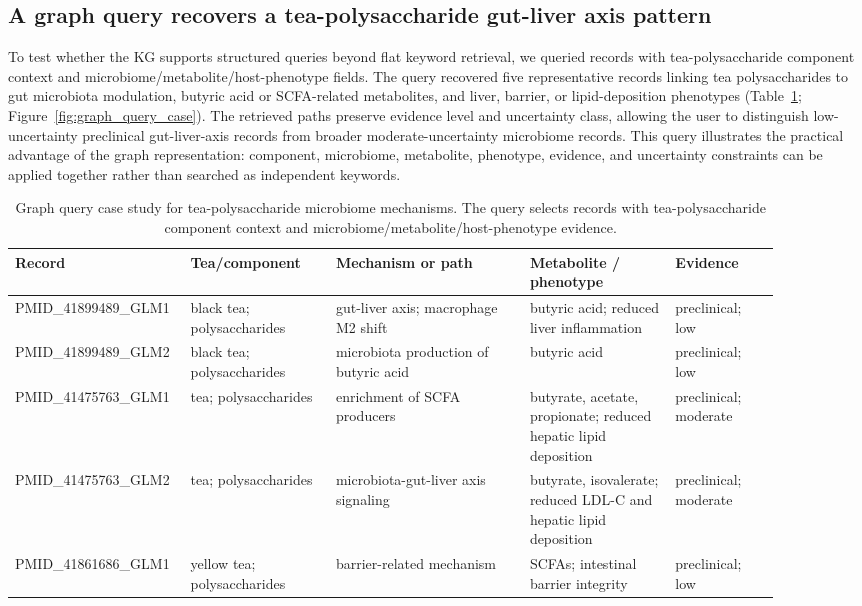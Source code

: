 \documentclass[11pt]{article}
\begin{document}
\subsection{A graph query recovers a tea-polysaccharide gut-liver axis pattern}

To test whether the KG supports structured queries beyond flat keyword retrieval, we queried records with tea-polysaccharide component context and microbiome/metabolite/host-phenotype fields. The query recovered five representative records linking tea polysaccharides to gut microbiota modulation, butyric acid or SCFA-related metabolites, and liver, barrier, or lipid-deposition phenotypes (Table~\ref{tab:graph_query_case}; Figure~\ref{fig:graph_query_case}). The retrieved paths preserve evidence level and uncertainty class, allowing the user to distinguish low-uncertainty preclinical gut-liver-axis records from broader moderate-uncertainty microbiome records. This query illustrates the practical advantage of the graph representation: component, microbiome, metabolite, phenotype, evidence, and uncertainty constraints can be applied together rather than searched as independent keywords.

\begin{table}[t]
\centering
\small
\caption{Graph query case study for tea-polysaccharide microbiome mechanisms. The query selects records with tea-polysaccharide component context and microbiome/metabolite/host-phenotype evidence.}
\label{tab:graph_query_case}
\begin{tabular}{p{0.16\linewidth}p{0.18\linewidth}p{0.24\linewidth}p{0.18\linewidth}p{0.13\linewidth}}
\toprule
Record & Tea/component & Mechanism or path & Metabolite / phenotype & Evidence \\
\midrule
PMID\_41899489\_GLM1 & black tea; polysaccharides & gut-liver axis; macrophage M2 shift & butyric acid; reduced liver inflammation & preclinical; low \\
PMID\_41899489\_GLM2 & black tea; polysaccharides & microbiota production of butyric acid & butyric acid & preclinical; low \\
PMID\_41475763\_GLM1 & tea; polysaccharides & enrichment of SCFA producers & butyrate, acetate, propionate; reduced hepatic lipid deposition & preclinical; moderate \\
PMID\_41475763\_GLM2 & tea; polysaccharides & microbiota-gut-liver axis signaling & butyrate, isovalerate; reduced LDL-C and hepatic lipid deposition & preclinical; moderate \\
PMID\_41861686\_GLM1 & yellow tea; polysaccharides & barrier-related mechanism & SCFAs; intestinal barrier integrity & preclinical; low \\
\bottomrule
\end{tabular}
\end{table}
\end{document}
